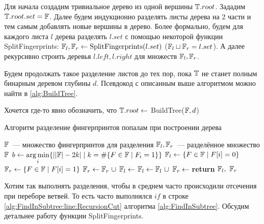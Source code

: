 Для начала создадим тривиальное дерево из одной вершины $\mathbb{T}.root$. Зададим $\mathbb{T}.root.set = \mathbb{F}$. Далее будем индукционно разделять листы дерева на 2 части и тем самым добавлять новые вершины в дерево.
Более формально, будем для каждого листа $l$ дерева разделять $l.set$  с помощью некоторой функции SplitFingerprints: $\mathbb{F}_l, \mathbb{F}_r \gets \text{SplitFingerprints}(l.set)$ ($\mathbb{F}_l \sqcup \mathbb{F}_r = l.set$).
А далее рекурсивно строить деревья $l.left, l.right$ для множеств $\mathbb{F}_l, \mathbb{F}_r$.

Будем продолжать такое разделение листов до тех пор, пока $\mathbb{T}$ не станет полным бинарным деревом глубины $d$. Псевдокод с описанным выше алгоритмом можно найти в \ref{alg:BuildTree}. 

{ \color{red} Хочется где-то явно обозначить, что $\mathbb{T}.root \gets $ BuildTree($\mathbb{F}, d$) }

\begin{algorithm}
  \caption{Алгоритм разделение фингерпринтов попалам при построении дерева} \label{alg:SplitFingerprints}
  \begin{algorithmic}[1]
    \Require $\mathbb{F}$~--- множество фингерпринтов для разделения
    \Ensure $\mathbb{F}_l, \mathbb{F}_r$~--- разделённое множество $\mathbb{F}$  
      \State $b \gets \operatorname*{arg\,min}\limits_{i}\{ \left| |\mathbb{F}| - 2k \right| \mid k = \# \{F \in \mathbb{F} \mid F_i = 1 \} \}$ 
      \State $\mathbb{F}_l \gets \{F \in \mathbb{F} \mid F[i] = 0\}$
      \State $\mathbb{F}_r \gets \{F \in \mathbb{F} \mid F[i] = 1\}$ 
	\State $\mathbb{F}_r \gets \mathbb{F}_r \ \cup$ 
	\State $\mathbb{F}_l \gets $  
	\State $\mathbb{F}_l \gets \mathbb{F}_l \ \cup$ 
	\State $\mathbb{F}_r \gets $  
      \EndIf
      \State \textbf{return} $\F_l, \ \F_r$ 
    \EndProcedure
  \end{algorithmic}
\end{algorithm}

Хотим так выполнять разделения, чтобы в среднем часто происходили отсечения при переборе ветвей. То есть часто выполнялся $if$ в строке \ref{alg:FindInSubtree:line:RecursionCut} алгоритма \ref{alg:FindInSubtree}. Обсудим детальнее работу функции SplitFingerprints.

